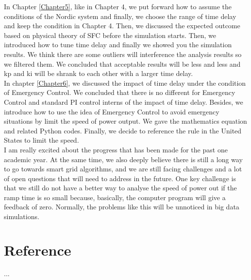 \documentclass{report}
\begin{document}
In Chapter \textcolor{red}{\ref{Chapter5}}, like in Chapter 4, we put forward how to assume the conditions of the Nordic system and finally, we choose the range of time delay and keep the condition in Chapter 4. Then, we discussed the expected outcome based on physical theory of SFC before the simulation starts. Then, we introduced how to tune time delay and finally we showed you the simulation results. We think there are some outliers will interference the analysis results so we filtered them. We concluded that acceptable results will be less and less and kp and ki will be shrank to each other with a larger time delay.\\

In chapter \textcolor{red}{\ref{Chapter6}}, we discussed the impact of time delay under the condition of  Emergency Control. We concluded that there is no different for Emergency Control and standard PI control interns of the impact of time delay. Besides, we introduce how to use the idea of Emergency Control to avoid emergency situations by limit the speed of power output. We gave the mathematics equation and related Python codes. Finally, we decide to reference the rule in the United States to limit the speed.\\

I am really excited about the progress that has been made for the past one academic year. At the same time, we also deeply believe there is still a long way to go towards smart grid algorithms, and we are still facing challenges and a lot of open questions that will need to address in the future. One key challenge is that we still do not have a better way to analyse the speed of power out if the ramp time is so small because, basically, the computer program will give a feedback of zero. Normally, the problems like this will be unnoticed in big data simulations.\\


\appendix
\chapter{Reference}
...


\end{document}
